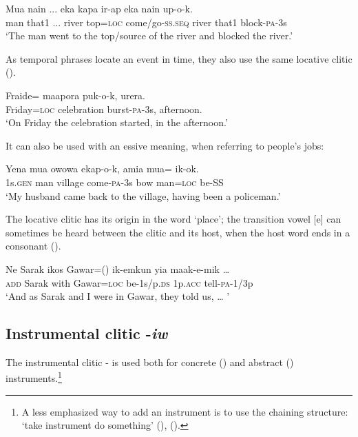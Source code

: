\ea%
\label{ex:x1879}
\gll Mua nain ... eka kapa ir-ap eka nain up-o-k.\\
man that1 ... river top=\textsc{loc} come/go-\textsc{ss}.\textsc{seq} river that1 block-\textsc{pa}-3s\\
\glt`The man went to the top/source of the river and blocked the river.'
\z

As temporal phrases locate an event in time, they also use the same locative clitic ().

\ea%
\label{ex:x763}
\gll Fraide= maapora puk-o-k, urera. \\
Friday=\textsc{loc} celebration burst-\textsc{pa}-3s, afternoon.\\
\glt`On Friday the celebration started, in the afternoon.'
\z

It can also be used with an essive meaning, when referring to people's jobs:

\ea%
\label{ex:x765}
\gll Yena mua owowa ekap-o-k, amia mua= ik-ok. \\
1s.\textsc{gen} man village come-\textsc{pa}-3s bow man=\textsc{loc} be-SS \\
\glt`My husband came back to the village, having been a policeman.'
\z

The locative clitic has its origin in the word  `place'; the transition vowel [e] can sometimes be heard between the clitic and its host, when the host word ends in a consonant ().

\ea%
\label{ex:x764}
\gll Ne Sarak ikos Gawar=() ik-emkun yia maak-e-mik {\dots} \\
\textsc{add} Sarak with Gawar=\textsc{loc} be-1s/p.\textsc{ds} 1p.\textsc{acc} tell-\textsc{pa}-1/3p\\
\glt`And as Sarak and I were in Gawar, they told us, {\dots} '
\z

\subsection{Instrumental clitic -\textit{iw}}
{}
The instrumental clitic -\textstyleStyleVernacularWordsItalic{} is used both for concrete () and abstract () instruments.\footnote{A less emphasized way to add an instrument is to use the chaining structure: `take instrument do something' (), ().} 

